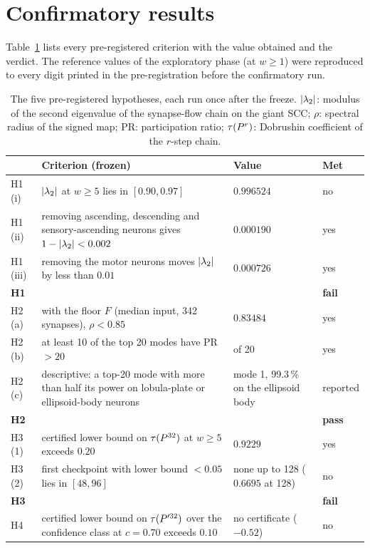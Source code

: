 \section{Confirmatory results}\label{sec:confirm}

Table~\ref{tab:verdicts} lists every pre-registered criterion with the value obtained and the
verdict. The reference values of the exploratory phase (at $w\ge1$) were reproduced to every digit
printed in the pre-registration before the confirmatory run.

\begin{table}[t]
\centering
\small
\caption{The five pre-registered hypotheses, each run once after the freeze. $\lvert\lambda_2\rvert$: modulus of
the second eigenvalue of the synapse-flow chain on the giant SCC; $\rho$: spectral radius of the
signed map; PR: participation ratio; $\tau(P^r)$: Dobrushin coefficient of the $r$-step chain.}
\label{tab:verdicts}
\begin{tabular}{@{}l>{\raggedright\arraybackslash}p{7.5cm}>{\raggedright\arraybackslash}p{3.4cm}l@{}}
\toprule
 & Criterion (frozen) & Value & Met \\
\midrule
H1 (i) & $\lvert\lambda_2\rvert$ at $w\ge5$ lies in $[0.90,0.97]$ & $0.996524$ & no \\
H1 (ii) & removing ascending, descending and sensory-ascending neurons gives $1-\lvert\lambda_2\rvert<0.002$ & $0.000190$ & yes \\
H1 (iii) & removing the motor neurons moves $\lvert\lambda_2\rvert$ by less than $0.01$ & $0.000726$ & yes \\
\textbf{H1} & & & \textbf{fail} \\
\addlinespace
H2 (a) & with the floor $F$ (median input, 342 synapses), $\rho<0.85$ & $0.83484$ & yes \\
H2 (b) & at least 10 of the top 20 modes have PR $>20$ & 19 of 20 & yes \\
H2 (c) & descriptive: a top-20 mode with more than half its power on lobula-plate or ellipsoid-body neurons & mode 1, 99.3\,\% on the ellipsoid body & reported \\
\textbf{H2} & & & \textbf{pass} \\
\addlinespace
H3 (1) & certified lower bound on $\tau(P^{32})$ at $w\ge5$ exceeds $0.20$ & $0.9229$ & yes \\
H3 (2) & first checkpoint with lower bound $<0.05$ lies in $[48,96]$ & none up to 128 ($0.6695$ at 128) & no \\
\textbf{H3} & & & \textbf{fail} \\
\addlinespace
H4 & certified lower bound on $\tau(P'^{32})$ over the confidence class at $c=0.70$ exceeds $0.10$ & no certificate ($-0.52$) & no \\

\end{tabular}
\end{table}
